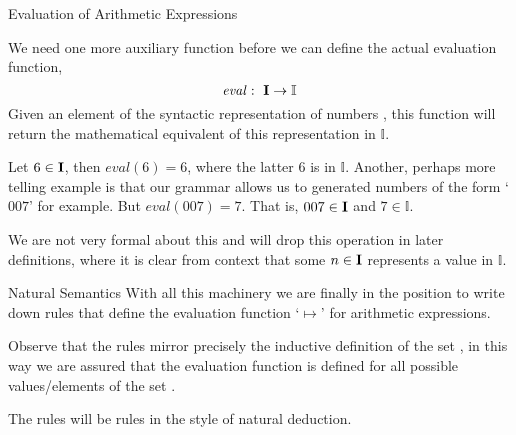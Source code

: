 \documentclass{beamer}
\begin{document}
\begin{frame}{\large Evaluation of Arithmetic Expressions}

\small
We need one more auxiliary function before we can define the actual evaluation function,
\[
\mathit{eval}\,\colon\; \mbox{\bf I} \rightarrow \mathbb{I}
\]
Given an element of the syntactic representation of numbers , this
function will return the mathematical equivalent of this representation in $\mathbb{I}$.

\vspace{.1in}

Let $6 \in \mbox{\bf I}$, then $\mathit{eval}(6) = 6$, where the latter $6$ is in $\mathbb{I}$.
Another, perhaps more telling example is that our grammar allows us to generated numbers of
the form `$007$' for example.  But $\mathit{eval}(007) = 7$.  That is, $007\in\mbox{\bf I}$ and
$7\in\mathbb{I}$.

\vspace{.1in}

We are not very formal about this and will
drop this operation in later definitions, where it is clear from context that some $n \in \mbox{\bf I}$
represents a value in $\mathbb I$.
\end{frame}

\begin{frame}{Natural Semantics}
With all this machinery we are finally in the position to write down rules that define the
evaluation function `$\mapsto$' for arithmetic expressions.

\vspace{.1in}

Observe that the rules mirror precisely the inductive definition of the set ,
in this way we are assured that the evaluation function is defined for all possible values/elements
of the set .

\vspace{.1in}

The rules will be rules in the style of natural deduction.
\end{frame}
\end{document}
